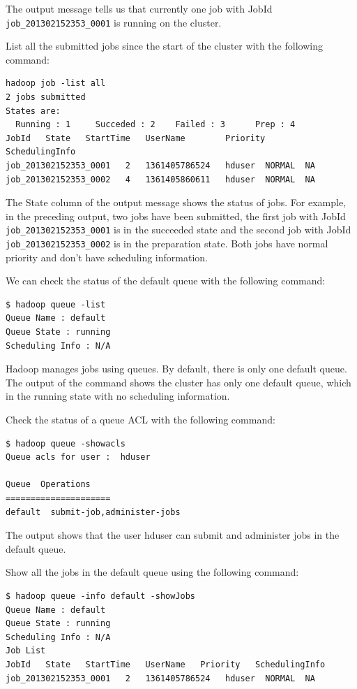 The output message tells us that currently one job with JobId \verb|job_201302152353_0001| is running on the cluster.

List all the submitted jobs since the start of the cluster with the following command: 
\lstset{style=bashstyle}
\begin{lstlisting}
hadoop job -list all
2 jobs submitted
States are:
  Running : 1     Succeded : 2    Failed : 3      Prep : 4
JobId   State   StartTime   UserName        Priority        SchedulingInfo
job_201302152353_0001   2   1361405786524   hduser  NORMAL  NA
job_201302152353_0002   4   1361405860611   hduser  NORMAL  NA
\end{lstlisting}

The State column of the output message shows the status of jobs. For example, in the preceding output, two jobs have been submitted, the first job with JobId \verb|job_201302152353_0001| is in the succeeded state and the second job with JobId \verb|job_201302152353_0002| is in the preparation state. Both jobs have normal priority and don't have scheduling information.

We can check the status of the default queue with the following command:
\begin{verbatim}
$ hadoop queue -list
Queue Name : default
Queue State : running
Scheduling Info : N/A
\end{verbatim}

Hadoop manages jobs using queues. By default, there is only one default queue. The output of the command shows the cluster has only one default queue, which in the running state with no scheduling information.

Check the status of a queue ACL with the following command: 
\begin{verbatim}
$ hadoop queue -showacls
Queue acls for user :  hduser

Queue  Operations
=====================
default  submit-job,administer-jobs
\end{verbatim}

The output shows that the user hduser can submit and administer jobs in the default queue.

Show all the jobs in the default queue using the following command:
\lstset{style=bashstyle}
\begin{lstlisting}
$ hadoop queue -info default -showJobs
Queue Name : default
Queue State : running
Scheduling Info : N/A
Job List
JobId   State   StartTime   UserName   Priority   SchedulingInfo
job_201302152353_0001   2   1361405786524   hduser  NORMAL  NA
\end{lstlisting}

